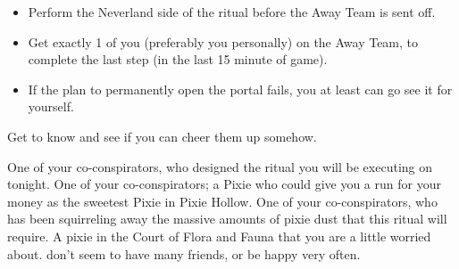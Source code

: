 \documentclass[char]{PP}
\begin{document}
\begin{itemz}
	\item 
	\begin{itemize}
		\item Perform the Neverland side of the ritual before the Away Team is sent off.
		\item Get exactly 1 of you (preferably you personally) on the Away Team, to complete the last step (in the last 15 minute of game).
		\item If the plan to permanently open the portal fails, you at least can go see it for yourself.
	\end{itemize}
	\item Get to know \cFWanabe{} and see if you can cheer them up somehow.
\end{itemz}

\begin{itemz}[Notes]
	\item 
\end{itemz}

\begin{contacts}
	\contact{\cSLibrarian{}} One of your co-conspirators, who designed the ritual you will be executing on tonight.
	\contact{\cESweet{}} One of your co-conspirators; a Pixie who could give you a run for your money as the sweetest Pixie in Pixie Hollow.
	\contact{\cMIron{}} One of your co-conspirators, who has been squirreling away the massive amounts of pixie dust that this ritual will require.
	\contact{\cFWanabe{}} A pixie in the Court of Flora and Fauna that you are a little worried about. \cFWanabe{\They} don’t seem to have many friends, or be happy very often.
\end{contacts}
\end{document}
